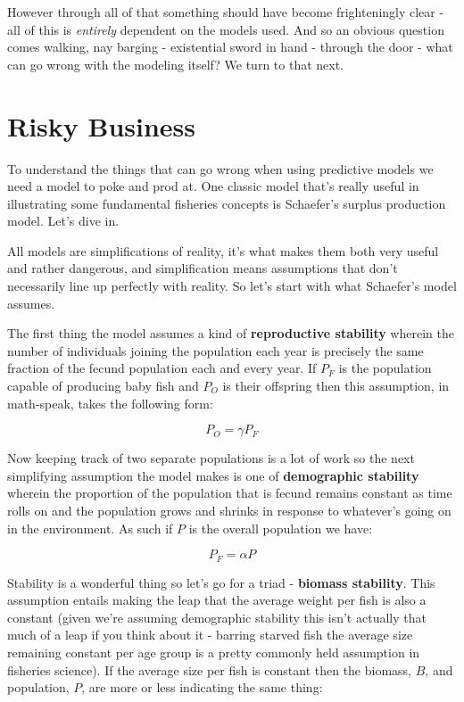 \documentclass[11pt,a5paper]{book}
\begin{document}
However through all of that something should have become frighteningly clear - all of this is \textit{entirely} dependent on the models used. And so an obvious question comes walking, nay barging - existential sword in hand - through the door - what can go wrong with the modeling itself? We turn to that next. 
\newpage

\chapter{Risky Business}
To understand the things that can go wrong when using predictive models we need a model to poke and prod at. One classic model that's really useful in illustrating some fundamental fisheries concepts is Schaefer's surplus production model. Let's dive in.
\newline

All models are simplifications of reality, it's what makes them both very useful and rather dangerous, and simplification means assumptions that don't necessarily line up perfectly with reality. So let's start with what Schaefer's model assumes. 
\newline

The first thing the model assumes a kind of \textbf{reproductive stability} wherein the number of individuals joining the population each year is precisely the same fraction of the fecund population each and every year. If $P_F$ is the population capable of producing baby fish and $P_O$ is their offspring then this assumption, in math-speak, takes the following form:

$$P_O = \gamma P_F$$

Now keeping track of two separate populations is a lot of work so the next simplifying assumption the model makes is one of \textbf{demographic stability} wherein the proportion of the population that is fecund remains constant as time rolls on and the population grows and shrinks in response to whatever's going on in the environment. As such if $P$ is the overall population we have:

$$P_F = \alpha P$$

Stability is a wonderful thing so let's go for a triad - \textbf{biomass stability}. This assumption entails making the leap that the average weight per fish is also a constant (given we're assuming demographic stability this isn't actually that much of a leap if you think about it - barring starved fish the average size remaining constant per age group is a pretty commonly held assumption in fisheries science). If the average size per fish is constant then the biomass, $B$, and population, $P$, are more or less indicating the same thing:
\end{document}
